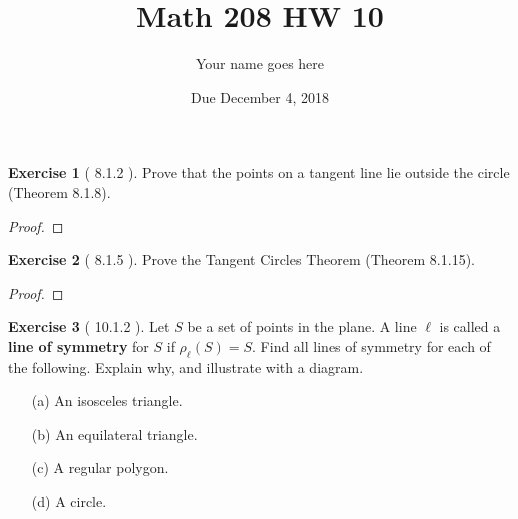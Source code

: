 \documentclass[11pt]{article}		%
\title{Math 208 HW 10}
\author{Your name goes here}  %
\date{Due December 4, 2018}
\theoremstyle{definition}
\newtheorem*{exercise*}{Exercise}
\begin{document}
	\maketitle
	
	





\begin{exercise*}[  8.1.2   ]
Prove that the points on a tangent line lie outside the circle  (Theorem 8.1.8).
	
\end{exercise*}

\begin{proof} 
	
\end{proof}


\vspace{1in}




\begin{exercise*}[ 8.1.5    ]
	Prove the Tangent Circles Theorem (Theorem 8.1.15).
	
\end{exercise*}

\begin{proof} 
	
\end{proof}


\vspace{1in}





\begin{exercise*}[ 10.1.2    ]
	Let $S$ be a set of points in the plane.  A line $\ell$ is called a \textbf{line of symmetry} for $S$ if $\rho_\ell(S) = S$.  Find all lines of symmetry for each of the following.  Explain why, and illustrate with a diagram.
	\begin{enumerate}
		\item[(a)] An isosceles triangle.
		\item[(b)] An equilateral triangle.
		\item[(c)] A regular polygon.
		\item[(d)] A circle.
	\end{enumerate}
	\vspace{.1in}
\end{exercise*}
\end{document}
